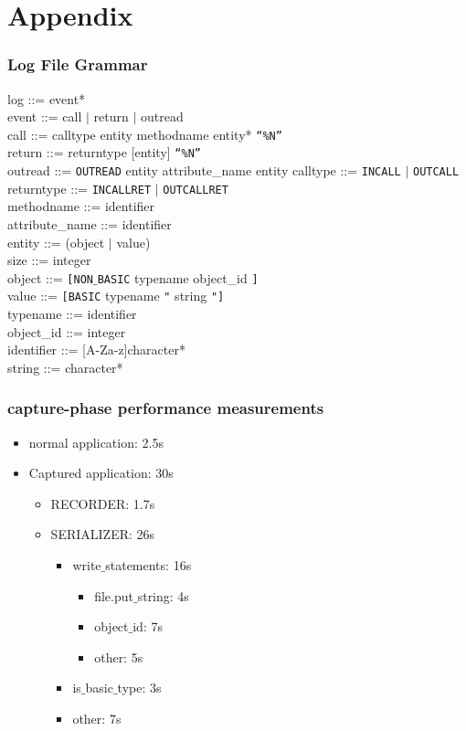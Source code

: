 \chapter{Appendix}

\subsection{Log File Grammar}
\label{lbl:log_file_grammar}
log ::= event* \\
event ::= call $\mid$ return $\mid$ outread\\
call ::= calltype entity methodname entity* \texttt{“\%N”} \\
return ::= returntype [entity]  \texttt{“\%N”}\\
outread ::= \texttt{OUTREAD} entity attribute\_name entity
calltype ::= \texttt{INCALL} $\mid$ \texttt{OUTCALL} \\
returntype ::= \texttt{INCALLRET} $\mid$ \texttt{OUTCALLRET} \\
methodname ::= identifier \\
attribute\_name ::= identifier \\
entity ::= (object $\mid$ value) \\
size ::= integer \\
object ::= \texttt{[NON$\_$BASIC} typename object\_id \texttt{]} \\
value ::= \texttt{[BASIC} typename \texttt{"} string \texttt{"]} \\
typename ::= identifier \\
object\_id ::= integer\\
identifier ::= [A-Za-z]character*\\
string ::= character*\\

\subsection{capture-phase performance measurements}
\begin{itemize}
	\item normal application: 2.5s
	\item Captured application: 30s
	\begin{itemize}
		\item RECORDER: 1.7s\\
		\item SERIALIZER: 26s
		\begin{itemize}
			\item write$\_$statements: 16s
			\begin{itemize}
				\item file.put$\_$string: 4s
				\item object$\_$id: 7s
				\item other: 5s
			\end{itemize}
			\item is$\_$basic$\_$type: 3s
			\item other: 7s
		\end{itemize}
	\end{itemize}
\end{itemize}